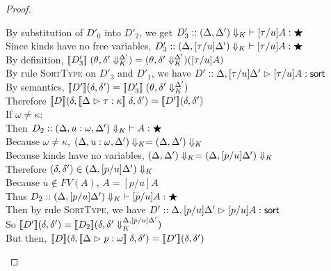 \begin{proof}
\begin{enumerate}
\begin{itemize}
\begin{tabbedproof}
        \ooooo By substitution of $D'_0$ into $D'_2$, we get
               $D'_3 :: \judgeWK[\restrictkind{\Delta, \Delta'}]{[\tau/u]A}{\bigstar}$ \\
        \ooooo Since kinds have no free variables, 
               $D'_3 :: \judgeWK[\restrictkind{\Delta, [\tau/u]\Delta'}]{[\tau/u]A}{\bigstar}$ \\
        \ooooo By definition, $\interp{D'_3}\;(\theta, \restricttyenv{\Delta'}{\delta'}) = 
                               (\theta, \restricttyenv{\Delta'}{\delta'})([\tau/u]A)$ \\
        \ooooo By rule \textsc{SortType} on $D'_3$ and $D'_1$, we have 
                 $D' :: \judgeSort[{\Delta, [\tau/u]\Delta'}]{[\tau/u]A}$ \\
        \ooooo By semantics, $\interp{D'}(\delta,\delta') = \interp{D'_3}\;(\theta, \restricttyenv{\Delta'}{\delta'})$ \\
        \ooooo Therefore $\interp{D}(\delta, \interp{\judgeA{\tau}{\kappa}}\;\delta, \delta') = 
                          \interp{D'}(\delta,\delta')$ \\
        \oooo If $\omega \not= \kappa$: \\
        \ooooo Then  $D_2 :: \judgeWK[\restrictkind{\Delta, u:\omega, \Delta'}]{A}{\bigstar}$ \\
        \ooooo Because $\omega \not= \kappa$, 
                 $\restrictkind{\Delta, u:\omega, \Delta'} = \restrictkind{\Delta, \Delta'}$ \\
        \ooooo Because kinds have no variables, 
                 $\restrictkind{\Delta, \Delta'} = \restrictkind{\Delta, [p/u]\Delta'}$ \\
        \ooooo Therefore $(\delta, \delta') \in \restrictkind{\Delta, [p/u]\Delta'}$ \\
        \ooooo Because $u \not\in FV(A)$, $A = [p/u]A$ \\
        \ooooo Thus $D_2 :: \judgeWK[\restrictkind{\Delta, [p/u]\Delta'}]{[p/u]A}{\bigstar}$ \\
        \ooooo Then by rule \textsc{SortType}, we have $D' :: \judgeSort[{\Delta, [p/u]\Delta'}]{[p/u]A}$ \\
        \ooooo So $\interp{D'}(\delta, \delta') = \interp{D_2}(\restricttyenv{\Delta,[p/u]\Delta'}{\delta, \delta'})$ \\
        \ooooo But then, $\interp{D}(\delta, \interp{\judgeA{p}{\omega}}\;\delta, \delta') = 
                          \interp{D'}(\delta, \delta')$ \\
      \end{tabbedproof}
    \end{itemize}
  \end{enumerate}
\end{proof}
  

